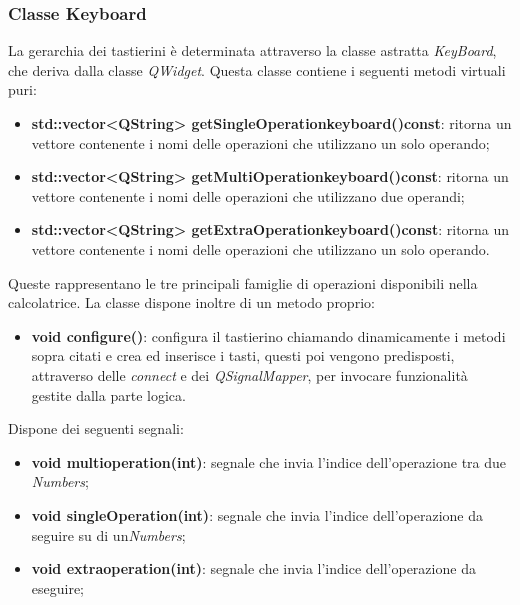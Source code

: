 \documentclass[a4paper,10pt]{article}
\begin{document}
        \subsubsection{Classe Keyboard}
        La gerarchia dei tastierini è determinata attraverso la classe astratta \textit{KeyBoard}, che deriva dalla classe \textit{QWidget}.
        Questa classe contiene i seguenti metodi virtuali puri:
        \begin{itemize}
            \item \textbf{std::vector<QString> getSingleOperationkeyboard()const}: ritorna un vettore contenente i nomi delle operazioni che utilizzano un solo operando;
            \item \textbf{std::vector<QString> getMultiOperationkeyboard()const}: ritorna un vettore contenente i nomi delle operazioni che utilizzano due operandi;
            \item \textbf{std::vector<QString> getExtraOperationkeyboard()const}: ritorna un vettore contenente i nomi delle operazioni che utilizzano un solo operando.
        \end{itemize}
        Queste rappresentano le tre principali famiglie di operazioni disponibili nella calcolatrice.
        La classe dispone inoltre di un metodo proprio:
            \begin{itemize}
                \item \textbf{void configure()}: configura il tastierino chiamando dinamicamente i metodi sopra citati e crea ed inserisce i tasti, questi poi vengono predisposti, attraverso delle \textit{connect} e dei \textit{QSignalMapper}, per invocare funzionalità gestite dalla parte logica.
            \end{itemize}
        Dispone dei seguenti segnali:
            \begin{itemize}
                \item \textbf{void multioperation(int)}: segnale che invia l'indice dell'operazione tra due \textit{Numbers};
                \item \textbf{void singleOperation(int)}: segnale che invia l'indice dell'operazione da seguire su di un\textit{Numbers};
                \item \textbf{void extraoperation(int)}: segnale che invia l'indice dell'operazione da eseguire;
            \end{itemize}
    
\end{document}
